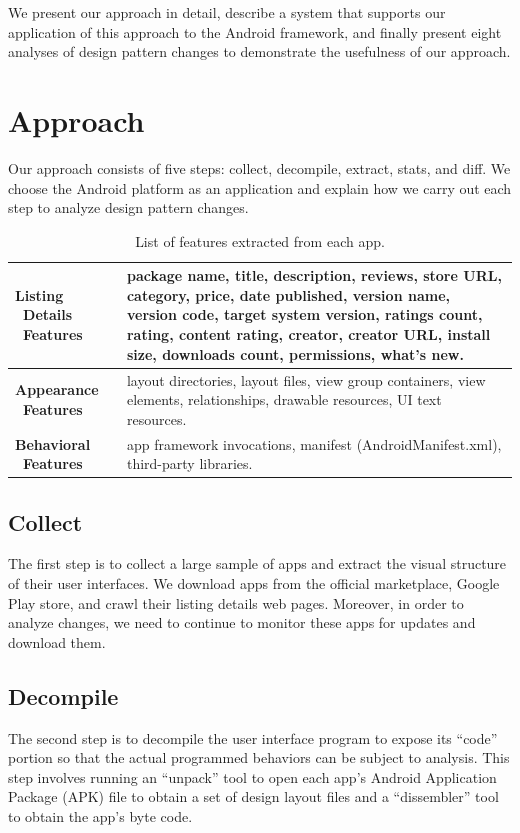 \par We present our approach in detail, describe a system that supports our application of this approach to the Android framework, and finally present eight analyses of design pattern changes to demonstrate the usefulness of our approach.
\section{Approach}

Our approach consists of five steps: collect, decompile, extract, stats, and diff.
We choose the Android platform as an application and explain how we carry out each step to analyze design pattern changes.

\begin{table}[t]
	\def\arraystretch{2}
	\centering
	\begin{tabular}{|p{2.2cm}|p{13cm}|}
		\hline
		\textbf{Listing \ Details \ Features} &
		package name, title, description, reviews, store URL, category, price, date published, version name, version code, target system version, ratings count, rating, content rating, creator, creator URL, install size, downloads count, permissions, what's new.\\
		\hline
		\textbf{Appearance \ Features} &
		layout directories, layout files, view group containers, view elements, relationships, drawable resources, UI text resources.\\
		\hline
		\textbf{Behavioral \ Features} &
		app framework invocations, manifest (AndroidManifest.xml), third-party libraries.\\
		\hline
	\end{tabular}
	\caption{List of features extracted from each app.}
	\label{tab:table_features}
\end{table}

\subsection{Collect}
The first step is to collect a large sample of apps and extract the visual structure of their user interfaces.
We download apps from the official marketplace, Google Play store, and crawl their listing details web pages.
Moreover, in order to analyze changes, we need to continue to monitor these apps for updates and download them.

\subsection{Decompile}
The second step is to decompile the user interface program to expose its ``code'' portion so that the actual programmed behaviors can be subject to analysis.
This step involves running an ``unpack'' tool to open each app's Android Application Package (APK) file to obtain a set of design layout files and a ``dissembler'' tool to obtain the app's byte code.

